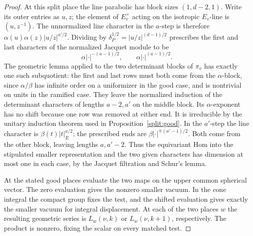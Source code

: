 \begin{proof}
At this split place the line parabolic has block sizes
\((1,d-2,1)\). Write its outer entries as \(u,z\); the element of
\(E_v^\times\) acting on the isotropic \(E_v\)-line is
\((u,z^{-1})\). The unnormalized line character in the \(a\)-step
is therefore \(\alpha(u)\alpha(z)|u/z|^{a'/2}\). Dividing by
\(\delta_P^{1/2}=|u/z|^{(d-1)/2}\) prescribes the first and last
characters of the normalized Jacquet module to be
\[
       \alpha|\cdot|^{-(a-1)/2},\qquad
       \alpha|\cdot|^{(a-1)/2}.
\]
The geometric lemma applied to the two determinant blocks of
\(\pi_v\) has exactly one such subquotient: the first and last
rows must both come from the \(\alpha\)-block, since
\(\alpha/\beta\) has infinite order on a uniformizer in the good
case, and is nontrivial on units in the ramified case. They leave
the normalized induction of the determinant characters of lengths
\(a-2,a'\) on the middle block. Its \(\alpha\)-exponent has no
shift because one row was removed at either end. It is irreducible
by the unitary induction theorem used in Proposition~\ref{split:good}.
In the \(a'\)-step the line character is \(\beta(t)|t|_E^{a/2}\);
the prescribed ends are \(\beta|\cdot|^{\mp(a'-1)/2}\). Both
come from the other block, leaving lengths \(a,a'-2\). Thus the
equivariant Hom into the stipulated smaller representation and
the two given characters has dimension at most one in each case,
by the Jacquet filtration and Schur's lemma. \cite[\S2.12]{bzgLemma}

At the stated good places evaluate the two maps on the upper
common spherical vector.
The zero evaluation gives the nonzero smaller vacuum. In the
cone integral the compact group fixes the test, and the shifted
evaluation gives exactly the smaller vacuum for integral displacement.
At each of the two places \(w\) the resulting geometric series
is \(L_w(\nu,k)\) or \(L_w(\nu,k+1)\), respectively. The product
is nonzero, fixing the scalar on every matched test.
\end{proof}

